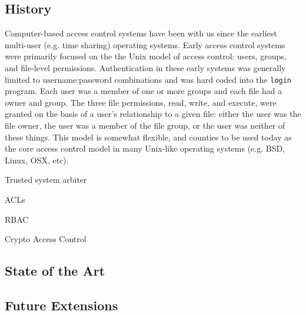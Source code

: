 \documentclass{sig-alternate}
\begin{document}
\subsection{History}

Computer-based access control systems have been with us since the
earliest multi-user (e.g. time sharing) operating systems. Early
access control systems were primarily focused on the the Unix model of
access control: users, groups, and file-level
permissions. Authentication in these early systems was generally
limited to username:password combinations and was hard coded into the
\texttt{login} program. Each user was a member of one or more groups
and each file had a owner and group. The three file permissions, read,
write, and execute, were granted on the basis of a user's relationship
to a given file: either the user was the file owner, the user was a
member of the file group, or the user was neither of these
things. This model is somewhat flexible, and counties to be used today
as the core access control model in many Unix-like operating systems
(e.g. BSD, Linux, OSX, etc).

Trusted system arbiter

ACLs

RBAC

Crypto Access Control

\subsection{State of the Art}

\subsection{Future Extensions}


\end{document}
